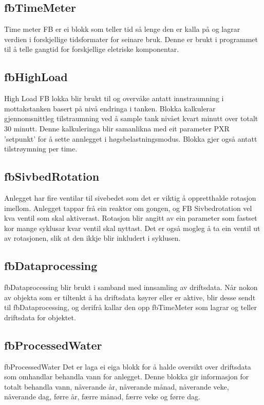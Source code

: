 \subsection{fbTimeMeter}
Time meter \gls{FB} er ei blokk som teller tid så lenge den er kalla på og lagrar verdien i forskjellige tidsformater for seinare bruk.
Denne er brukt i programmet til å telle gangtid for forskjellige eletriske komponentar.

\subsection{fbHighLoad}
High Load \gls{FB} lokka blir brukt til og overvåke antatt innstraumning i mottakstanken basert på nivå endringa i tanken. 
Blokka kalkulerar gjennomsnittleg tilstraumning ved å sample tank nivået kvart minutt over totalt 30 minutt.
Denne kalkuleringa blir samanlikna med eit parameter PXR 'setpunkt' for å sette annlegget i høgsbelastningsmodus.
Blokka gjer også antatt tilstrøymning per time.

\subsection{fbSivbedRotation}
Anlegget har fire ventilar til sivebedet som det er viktig å oppretthalde rotasjon imellom. Anlegget tappar frå ein reaktor om gongen, 
og \gls{FB} Sivbedrotation vel kva ventil som skal aktiverast.
Rotasjon blir angitt av ein parameter som fastset kor mange syklusar kvar ventil skal nyttast. 
Det er også mogleg å ta ein ventil ut av rotasjonen, slik at den ikkje blir inkludert i syklusen.

\subsection{fbDataprocessing}
fbDataprocessing blir brukt i samband med innsamling av driftsdata. 
Når nokon av objekta som er tiltenkt å ha driftsdata køyrer eller er aktive, blir desse sendt til fbDataprocessing, og derifrå kallar den opp fbTimeMeter som lagrar og teller driftsdata for objektet.

\subsection{fbProcessedWater}
fbProcessedWater 
Det er laga ei eiga blokk for å halde oversikt over driftsdata som omhandlar behandla vann for anlegget. 
Denne blokka gir informasjon for totalt behandla vann, nåverande år, nåverande månad, nåverande veke, nåverande dag, førre år, færre månad, færre veke og førre dag.